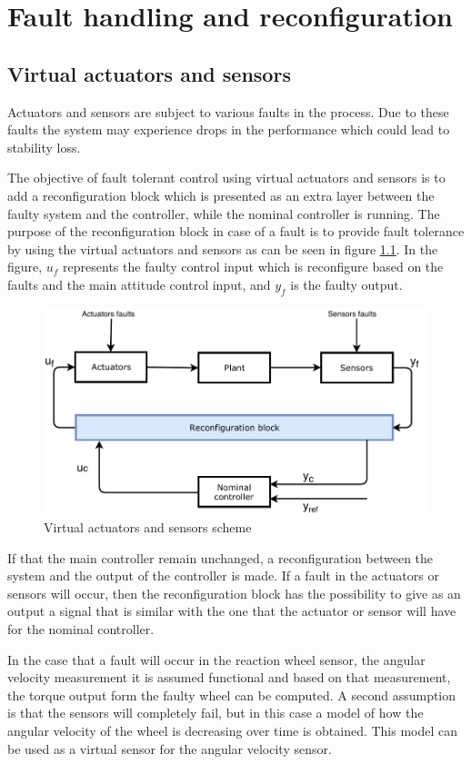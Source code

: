 \chapter{Fault handling and reconfiguration}  \label{chap:faltHandling}
 \section{Virtual actuators and sensors} \label{chap: virtual}
 Actuators and sensors are subject to various faults in the process. Due to these faults the system may experience drops in the performance which could lead to stability loss.
 
 The objective of fault tolerant control using virtual actuators and sensors is to add a reconfiguration block which is presented as an extra layer between the faulty system and the controller, while the nominal controller is running. The purpose of the reconfiguration block in case of a fault is to provide fault tolerance by using the virtual actuators and sensors as can be seen in figure \ref{fig:VA}. In the figure, $u_f$ represents the faulty control input which is reconfigure based on the faults and the main attitude control input, and $y_f$ is the faulty output. 
 \begin{figure}[H]
 	\centering
 	\includegraphics[width=0.8\linewidth]{figures/VirtualActuator}
 	\caption{ Virtual actuators and sensors scheme}
 	\label{fig:VA}
 \end{figure}
 
 If that the main controller remain unchanged, a reconfiguration between the system and the output of the controller is made. If a fault in the actuators or sensors will occur, then the reconfiguration block has the possibility to give as an output a signal that is similar with the one that the actuator or sensor will have for the nominal controller.
 
 In the case that a fault will occur in the reaction wheel sensor, the angular velocity measurement it is assumed functional and based on that measurement, the torque output form the faulty wheel can be computed. A second assumption is that the sensors will completely fail, but in this case a model of how the angular velocity of the wheel is decreasing over time is obtained. This model can be used as a virtual sensor for the angular velocity sensor. 
 
